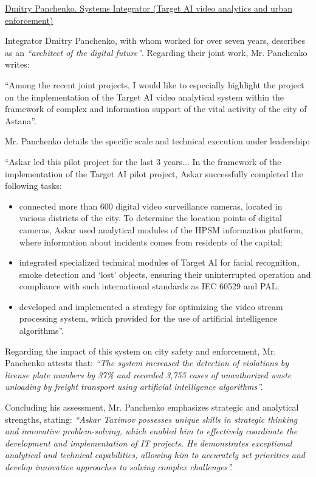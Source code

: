 \bigskip
\noindent\underline{Dmitry Panchenko. Systems Integrator (Target AI video analytics and urban enforcement)}

Integrator Dmitry Panchenko, with whom \mrl{} worked for over seven years, describes \mrl{} as an \emph{``architect of the digital future''}. Regarding their joint work, Mr. Panchenko writes:
\begin{fullquote}
``Among the recent joint projects, I would like to especially highlight the project on the implementation of the Target AI video analytical system within the framework of complex and information support of the vital activity of the city of Astana''.
\end{fullquote}

Mr. Panchenko details the specific scale and technical execution under \mrls leadership:
\begin{fullquote}
``Askar led this pilot project for the last 3 years... In the framework of the implementation of the Target AI pilot project, Askar successfully completed the following tasks:
\begin{itemize}[nosep]
\item connected more than 600 digital video surveillance cameras, located in various districts of the city. To determine the location points of digital cameras, Askar used analytical modules of the HPSM information platform, where information about incidents comes from residents of the capital;
\item integrated specialized technical modules of Target AI for facial recognition, smoke detection and `lost' objects, ensuring their uninterrupted operation and compliance with such international standards as IEC 60529 and PAL;
\item developed and implemented a strategy for optimizing the video stream processing system, which provided for the use of artificial intelligence algorithms''.
\end{itemize}
\end{fullquote}

Regarding the impact of this system on city safety and enforcement, Mr. Panchenko attests that:
\emph{``The system increased the detection of violations by license plate numbers by 37\% and recorded 3,755 cases of unauthorized waste unloading by freight transport using artificial intelligence algorithms''.}

Concluding his assessment, Mr. Panchenko emphasizes \mrls strategic and analytical strengths, stating:
\emph{``Askar Taximov possesses unique skills in strategic thinking and innovative problem-solving, which enabled him to effectively coordinate the development and implementation of IT projects. He demonstrates exceptional analytical and technical capabilities, allowing him to accurately set priorities and develop innovative approaches to solving complex challenges''.} 

